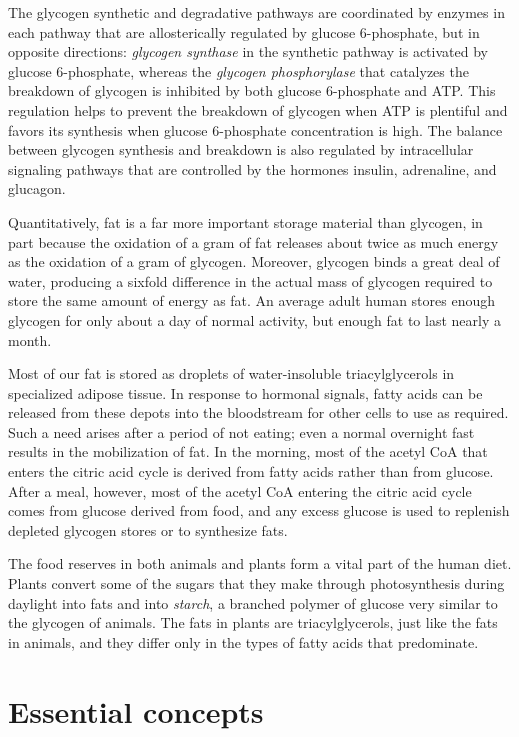 The glycogen synthetic and degradative pathways are coordinated by
enzymes in each pathway that are allosterically regulated by glucose
6-phosphate, but in opposite directions: \textit{glycogen synthase} in the synthetic
pathway is activated by glucose 6-phosphate, whereas the \textit{glycogen
phosphorylase} that catalyzes the breakdown of glycogen is inhibited by
both glucose 6-phosphate and ATP. This regulation helps to prevent the
breakdown of glycogen when ATP is plentiful and favors its synthesis
when glucose 6-phosphate concentration is high. The balance between
glycogen synthesis and breakdown is also regulated by intracellular signaling
pathways that are controlled by the hormones insulin, adrenaline,
and glucagon.

Quantitatively, fat is a far more important storage material than glycogen,
in part because the oxidation of a gram of fat releases about twice as
much energy as the oxidation of a gram of glycogen. Moreover, glycogen
binds a great deal of water, producing a sixfold difference in the actual
mass of glycogen required to store the same amount of energy as fat.
An average adult human stores enough glycogen for only about a day
of normal activity, but enough fat to last nearly a month.

Most of our fat is stored as droplets of water-insoluble triacylglycerols in
specialized adipose tissue.
In response to hormonal signals, fatty acids can be released from these
depots into the bloodstream for other cells to use as required. Such a
need arises after a period of not eating; even a normal overnight fast
results in the mobilization of fat. In the morning, most of the acetyl CoA
that enters the citric acid cycle is derived from fatty acids rather than from
glucose. After a meal, however, most of the acetyl CoA entering the citric
acid cycle comes from glucose derived from food, and any excess glucose
is used to replenish depleted glycogen stores or to synthesize fats.

The food reserves in both animals and plants form a vital part of the
human diet. Plants convert some of the sugars that they make through
photosynthesis during daylight into fats and into \textit{starch}, a branched polymer
of glucose very similar to the glycogen of animals. The fats in plants
are triacylglycerols, just like the fats in animals, and they differ only in the
types of fatty acids that predominate.

\section{Essential concepts}

